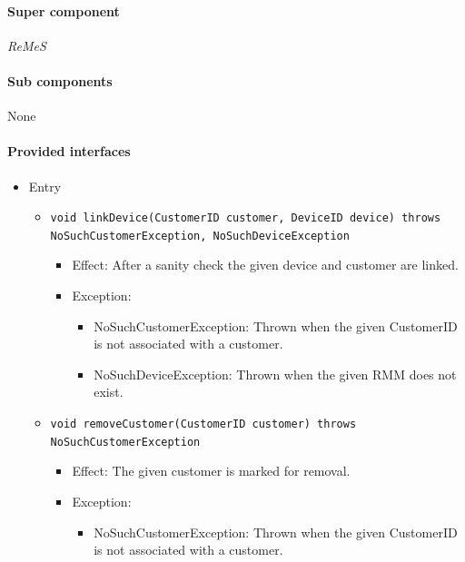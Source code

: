 \documentclass[a4paper,10pt]{article}
\newcommand{\rem}{\emph{ReMeS}\xspace}
\begin{document}
\paragraph{Super component} \rem

\paragraph{Sub components} None

\paragraph{Provided interfaces}
\begin{itemize}
	\item Entry
    \begin{itemize}
    	\item \texttt{void linkDevice(CustomerID customer, DeviceID device) throws NoSuchCustomerException, NoSuchDeviceException}
        \begin{itemize}
        	\item Effect: After a sanity check the given device and customer are linked.
            \item Exception:
           	\begin{itemize}
            	\item NoSuchCustomerException: Thrown when the given CustomerID is not associated with a customer.
                \item NoSuchDeviceException: Thrown when the given RMM does not exist.
            \end{itemize}
        \end{itemize}
        
    	\item \texttt{void removeCustomer(CustomerID customer) throws NoSuchCustomerException}
        	\begin{itemize}
            	\item Effect: The given customer is marked for removal.
                \item Exception:
                \begin{itemize}
                	\item NoSuchCustomerException: Thrown when the given CustomerID is not associated with a customer.
                \end{itemize}
            \end{itemize}
            

\end{itemize}
\end{itemize}
\end{document}
